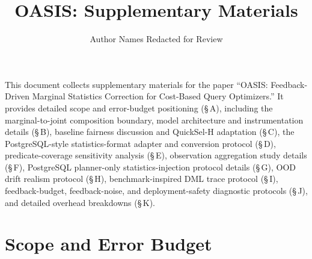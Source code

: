 \documentclass[runningheads]{llncs}
\begin{document}
\title{OASIS: Supplementary Materials}


\author{Author Names Redacted for Review}



\maketitle

This document collects supplementary materials for the paper
``OASIS: Feedback-Driven Marginal Statistics Correction for Cost-Based Query Optimizers.''
It provides detailed scope and error-budget positioning (\S\,A),
including the marginal-to-joint composition boundary,
model architecture and instrumentation details (\S\,B),
baseline fairness discussion and QuickSel-H adaptation (\S\,C),
the PostgreSQL-style statistics-format adapter and conversion protocol (\S\,D),
predicate-coverage sensitivity analysis (\S\,E),
observation aggregation study details (\S\,F),
PostgreSQL planner-only statistics-injection protocol details (\S\,G),
OOD drift realism protocol (\S\,H),
benchmark-inspired DML trace protocol (\S\,I),
feedback-budget, feedback-noise, and deployment-safety diagnostic protocols
(\S\,J), and detailed overhead breakdowns (\S\,K).

\section{Scope and Error Budget}
\label{sec:scope-app}
\end{document}
